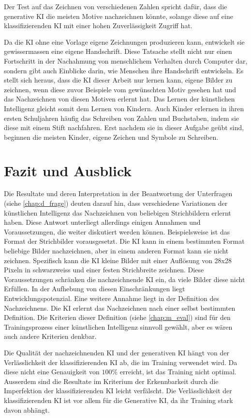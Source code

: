 Der Test auf das Zeichnen von verschiedenen Zahlen spricht dafür, dass die
generative KI die meisten Motive nachzeichnen könnte, solange diese auf eine 
klassifizierenden KI mit einer hohen Zuverlässigkeit Zugriff hat.

Da die KI ohne eine Vorlage eigene Zeichnungen produzieren kann, entwickelt sie
gewissermassen eine eigene Handschrift. Diese Tatsache stellt nicht nur einen
Fortschritt in der Nachahmung von menschlichem Verhalten durch Computer dar,
sondern gibt auch Einblicke darin, wie Menschen ihre Handschrift entwickeln. Es
stellt sich heraus, dass die KI dieser Arbeit nur lernen kann, eigene Bilder zu
zeichnen, wenn diese zuvor Beispiele vom gewünschten Motiv gesehen hat und das
Nachzeichnen von diesen Motiven erlernt hat. Das Lernen der künstlichen
Intelligenz gleicht somit dem Lernen von Kindern. Auch Kinder erlernen in ihren
ersten Schuljahren häufig das Schreiben von Zahlen und Buchstaben, indem sie
diese mit einem Stift nachfahren. Erst nachdem sie in dieser Aufgabe geübt sind,
beginnen die meisten Kinder, eigene Zeichen und Symbole zu Schreiben.


\section{Fazit und Ausblick}\label{chap:d_faz-aus} Die Resultate und deren
Interpretation in der Beantwortung der Unterfragen (siehe \ref{chap:d_frage})
deuten darauf hin, dass verschiedene Variationen der künstlichen Intelligenz das
Nachzeichnen von beliebigen Strichbildern erlernt haben. Diese Antwort
unterliegt allerdings einigen Annahmen und Voraussetzungen, die weiter
diskutiert werden können. Beispielsweise ist das Format der Strichbilder
vorausgesetzt. Die KI kann in einem bestimmten Format beliebige Bilder
nachzeichnen, aber in einem anderen Format kann sie nicht zeichnen. Spezifisch
kann die KI kleine Bilder mit einer Auflösung von 28x28 Pixeln in schwarzweiss
und einer festen Strichbreite zeichnen. Diese Voraussetzungen schränken die
nachzeichnende KI ein, da viele Bilder diese nicht Erfüllen. In der Aufhebung
von diesen Einschränkungen liegt Entwicklungspotenzial. Eine weitere Annahme
liegt in der Definition des Nachzeichnens. Die KI erlernt das Nachzeichnen nach
einer selbst bestimmten Definition. Die Kriterien dieser Definition (siehe
\ref{chap:m_eval}) sind für den Trainingsprozess einer künstlichen Intelligenz
sinnvoll gewählt, aber es wären auch andere Kriterien denkbar.

Die Qualität der nachzeichnenden KI und der generativen KI hängt von der
Verlässlichkeit der klassifizierenden KI ab, die im Training verwendet wird. Da
diese nicht eine Genauigkeit von $100\%$ erreicht, ist das Training nicht
optimal. Ausserdem sind die Resultate im Kriterium der Erkennbarkeit durch die
Imperfektion der klassifizierenden KI leicht verfälscht. Die Verlässlichkeit der
klassifizierenden KI ist vor allem für die Generative KI, da ihr Training stark
davon abhängt.

